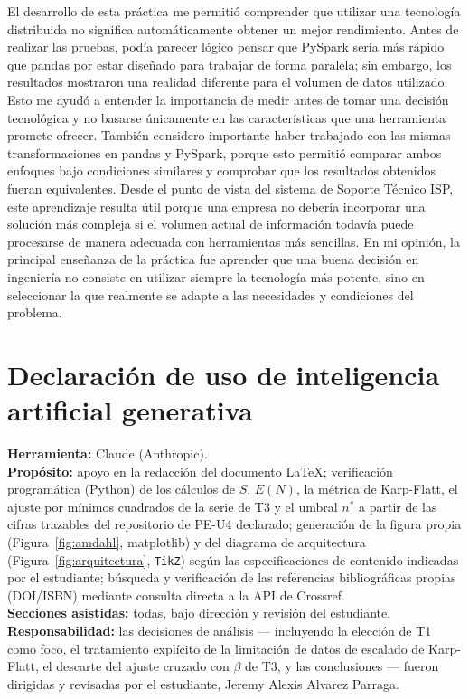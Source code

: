 \documentclass[11pt,a4paper]{article}
\begin{document}
El desarrollo de esta pr\'actica me permiti\'o comprender que utilizar una tecnolog\'ia
distribuida no significa autom\'aticamente obtener un mejor rendimiento. Antes de realizar las
pruebas, pod\'ia parecer l\'ogico pensar que PySpark ser\'ia m\'as r\'apido que pandas por estar
dise\~nado para trabajar de forma paralela; sin embargo, los resultados mostraron una realidad
diferente para el volumen de datos utilizado. Esto me ayud\'o a entender la importancia de medir
antes de tomar una decisi\'on tecnol\'ogica y no basarse \'unicamente en las caracter\'isticas
que una herramienta promete ofrecer. Tambi\'en considero importante haber trabajado con las
mismas transformaciones en pandas y PySpark, porque esto permiti\'o comparar ambos enfoques bajo
condiciones similares y comprobar que los resultados obtenidos fueran equivalentes. Desde el
punto de vista del sistema de Soporte T\'ecnico ISP, este aprendizaje resulta \'util porque una
empresa no deber\'ia incorporar una soluci\'on m\'as compleja si el volumen actual de informaci\'on
todav\'ia puede procesarse de manera adecuada con herramientas m\'as sencillas. En mi opini\'on,
la principal ense\~nanza de la pr\'actica fue aprender que una buena decisi\'on en ingenier\'ia
no consiste en utilizar siempre la tecnolog\'ia m\'as potente, sino en seleccionar la que
realmente se adapte a las necesidades y condiciones del problema.

\section{Declaraci\'on de uso de inteligencia artificial generativa}

\textbf{Herramienta:} Claude (Anthropic).\\
\textbf{Prop\'osito:} apoyo en la redacci\'on del documento LaTeX; verificaci\'on program\'atica
(Python) de los c\'alculos de $S$, $E(N)$, la m\'etrica de Karp-Flatt, el ajuste por m\'inimos
cuadrados de la serie de T3 y el umbral $n^{*}$ a partir de las cifras trazables del
repositorio de PE-U4 declarado; generaci\'on de la figura propia (Figura~\ref{fig:amdahl},
matplotlib) y del diagrama de arquitectura (Figura~\ref{fig:arquitectura}, \texttt{TikZ})
seg\'un las especificaciones de contenido indicadas por el estudiante; b\'usqueda y
verificaci\'on de las referencias bibliogr\'aficas propias (DOI/ISBN) mediante consulta directa
a la API de Crossref.\\
\textbf{Secciones asistidas:} todas, bajo direcci\'on y revisi\'on del estudiante.\\
\textbf{Responsabilidad:} las decisiones de an\'alisis --- incluyendo la elecci\'on de T1 como
foco, el tratamiento expl\'icito de la limitaci\'on de datos de escalado de Karp-Flatt, el
descarte del ajuste cruzado con $\beta$ de T3, y las conclusiones --- fueron dirigidas y
revisadas por el estudiante, Jeremy Alexis Alvarez Parraga.
\end{document}
